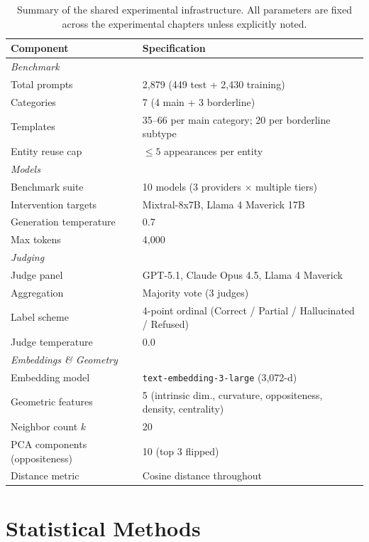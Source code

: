 \begin{table}[ht]
\centering
\small
\begin{tabular}{ll}
\toprule
\textbf{Component} & \textbf{Specification} \\
\midrule
\multicolumn{2}{l}{\textit{Benchmark}} \\
Total prompts & 2,879 (449 test + 2,430 training) \\
Categories & 7 (4 main + 3 borderline) \\
Templates & 35--66 per main category; 20 per borderline subtype \\
Entity reuse cap & $\leq 5$ appearances per entity \\
\midrule
\multicolumn{2}{l}{\textit{Models}} \\
Benchmark suite & 10 models (3 providers $\times$ multiple tiers) \\
Intervention targets & Mixtral-8x7B, Llama 4 Maverick 17B \\
Generation temperature & 0.7 \\
Max tokens & 4,000 \\
\midrule
\multicolumn{2}{l}{\textit{Judging}} \\
Judge panel & GPT-5.1, Claude Opus 4.5, Llama 4 Maverick \\
Aggregation & Majority vote (3 judges) \\
Label scheme & 4-point ordinal (Correct / Partial / Hallucinated / Refused) \\
Judge temperature & 0.0 \\
\midrule
\multicolumn{2}{l}{\textit{Embeddings \& Geometry}} \\
Embedding model & \texttt{text-embedding-3-large} (3,072-d) \\
Geometric features & 5 (intrinsic dim., curvature, oppositeness, density, centrality) \\
Neighbor count $k$ & 20 \\
PCA components (oppositeness) & 10 (top 3 flipped) \\
Distance metric & Cosine distance throughout \\
\bottomrule
\end{tabular}
\caption{Summary of the shared experimental infrastructure. All parameters are fixed across the experimental chapters unless explicitly noted.}
\label{tab:setup-summary}
\end{table}

\section{Statistical Methods}
\label{sec:statistical-methods}

